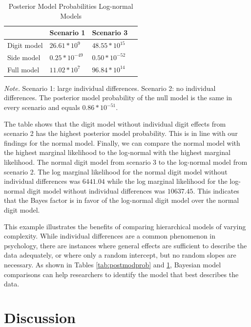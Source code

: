 \documentclass[
  english,
  doc,floatsintext]{apa6}
\begin{document}
\begin{table}[H]
\caption{Posterior Model Probabilities Log-normal Models}
\label{tab:postmodproblog}
\begin{tabularx}{\textwidth}{XXXX}
\toprule
 & \multicolumn{1}{l}{Scenario 1} & \multicolumn{1}{c}{Scenario 3}\\
\midrule
Digit model & $26.61 * 10^9$ & $48.55 * 10^{15}$\\
Side model & $0.25 * 10^{-49}$  & $0.50 * 10^{-52}$ \\
Full model & $11.02 * 10^7$ &  $96.84 * 10^{14}$\\
\bottomrule
\end{tabularx}
\begin{tablenotes}[para]
\textit{Note.} Scenario 1: large individual differences. Scenario 2: no individual differences. The posterior model probability of the null model is the same in every scenario and equals $0.86*10^{-51}$. 
\end{tablenotes}
\end{table}

The table shows that the digit model without individual digit effects from scenario 2 has the highest posterior model probability. This is in line with our findings for the normal model. Finally, we can compare the normal model with the highest marginal likelihood to the log-normal with the highest marginal likelihood. The normal digit model from scenario 3 to the log-normal model from scenario 2. The log marginal likelihood for the normal digit model without individual differences was \(6441.04\) while the log marginal likelihood for the log-normal digit model without individual differences was \(10637.45\). This indicates that the Bayes factor is in favor of the log-normal digit model over the normal digit model.

This example illustrates the benefits of comparing hierarchical models of varying complexity. While individual differences are a common phenomenon in psychology, there are instances where general effects are sufficient to describe the data adequately, or where only a random intercept, but no random slopes are necessary. As shown in Tables \ref{tab:postmodprob} and \ref{tab:postmodproblog}, Bayesian model comparisons can help researchers to identify the model that best describes the data.

\hypertarget{discussion}{%
\section{Discussion}\label{discussion}}
\end{document}
